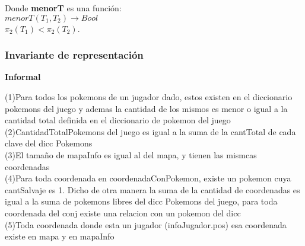 \begin{Representacion}
	
	\begin{Tupla}[InfoCoordenada]
	\end{Tupla}

	\begin{Tupla}[T]
	\end{Tupla}

\vskip 0.5cm
Donde \textbf{menorT} es una funci\'on:\\
$menorT(T_1, T_2) \rightarrow Bool$\\
$\pi_2(T_1) <  \pi_2(T_2)$.

\subsubsection{Invariante de representación}

\textbf{Informal}

(1)Para todos los pokemons de un jugador dado, estos existen en el diccionario pokemons del juego y ademas la cantidad de los mismos es menor o igual a la cantidad total definida en el diccionario de pokemon del juego\\

(2)CantidadTotalPokemons del juego es igual a la suma de la cantTotal de cada clave del dicc Pokemons\\

(3)El tamaño de mapaInfo es igual al del mapa, y tienen las mismcas coordenadas\\

(4)Para toda coordenada en coordenadaConPokemon, existe un pokemon cuya cantSalvaje es 1. Dicho de otra manera la suma de la cantidad de coordenadas es igual a la suma de pokemons libres del dicc Pokemons del juego, para toda coordenada del conj existe una relacion con un pokemon del dicc\\

(5)Toda coordenada donde esta un jugador (infoJugador.pos) esa coordenada existe en mapa y en mapaInfo\\


\end{Representacion}
